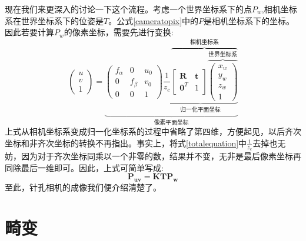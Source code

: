 现在我们来更深入的讨论一下这个流程。考虑一个世界坐标系下的点$P_w$,相机坐标系在世界坐标系下的位姿是$T$。公式\ref{cameratopix}中的$P$是相机坐标系下的坐标。因此若要计算$P_w$的像素坐标，需要先进行变换:
\begin{equation}
\left( \begin{array}{c}{u} \\ {v} \\ {1}\end{array}\right)=
\underbrace{
\left( \begin{array}{ccc}{f_{\alpha}} & {0} & {u_{0}} \\ {0} & {f_{\beta}} & {v_{0}} \\ {0} & {0} & {1}\end{array}\right)
\underbrace{\frac{1}{z_{c}}\overbrace{\left[ \begin{array}{cc}{\boldsymbol{R}} & {\boldsymbol{t}} \\ {\boldsymbol{0}^{T}} & {1}\end{array}\right]
\overbrace{\left( \begin{array}{c}{x_{w}} \\ {y_{w}} \\ {z_{w}} \\ {1}\end{array}\right)}^\text{世界坐标系}}^\text{相机坐标系}}_\text{归一化平面坐标}}_\text{像素平面坐标}\label{totalequation}
\end{equation}
上式从相机坐标系变成归一化坐标系的过程中省略了第四维，方便起见，以后齐次坐标和非齐次坐标的转换不再指出。事实上，将式\ref{totalequation}中$\frac{1}{z_c}$去掉也无妨，因为对于齐次坐标同乘以一个非零的数，结果并不变，无非是最后像素坐标再同除最后一维即可。因此，上式可简单写成:
\begin{equation}
	\boldsymbol{P_{uv}=KTP_w}
\end{equation}
至此，针孔相机的成像我们便介绍清楚了。
\section{畸变}
